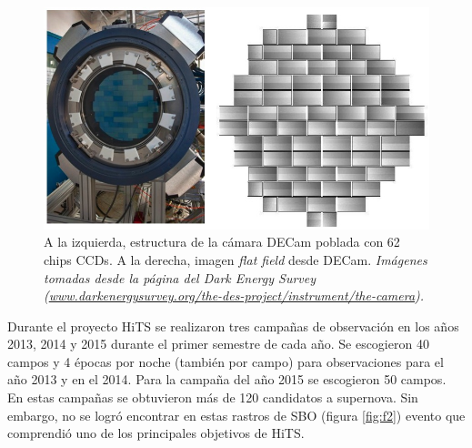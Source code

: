 \begin{figure}[h!]
\centering
\includegraphics[scale=.5]{images/CCDs.jpg}
\caption{A la izquierda, estructura de la c\'amara DECam poblada con 62 chips CCDs. A la derecha, imagen \textit{flat field} desde DECam. \textit{Im\'agenes tomadas desde la p\'agina del Dark Energy Survey (\url{www.darkenergysurvey.org/the-des-project/instrument/the-camera}).}}
\label{fig:f3}
\end{figure}

Durante el proyecto HiTS se realizaron tres campa\~nas de observaci\'on en los a\~nos 2013, 2014 y 2015 durante el primer semestre de cada a\~no. Se escogieron 40 campos y 4 \'epocas por noche (tambi\'en por campo) para observaciones para el a\~no 2013 y en el 2014. Para la campa\~na del a\~no 2015 se escogieron 50 campos. En estas campa\~nas se obtuvieron m\'as de 120 candidatos a supernova. Sin embargo, no se logr\'o encontrar en estas rastros de SBO (figura \ref{fig:f2}) evento que comprendi\'o uno de los principales objetivos de HiTS. 


